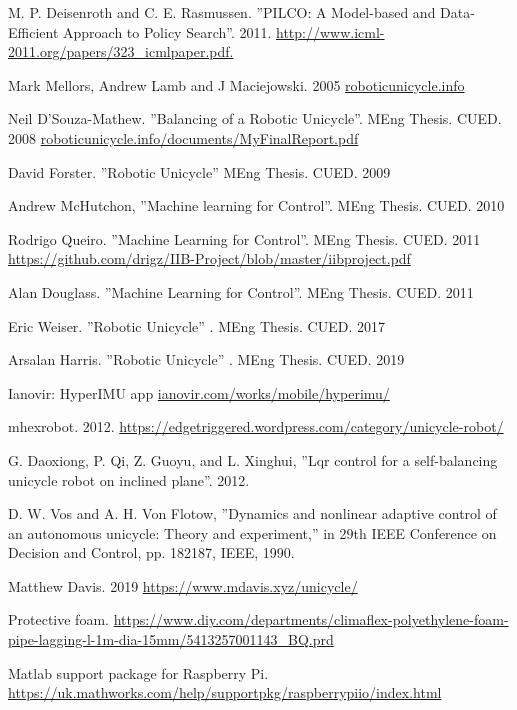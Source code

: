 \documentclass[twoside,twocolumn,12pt]{article}
\begin{document}
\clearpage
\begin{thebibliography}{9}
M. P. Deisenroth and C. E. Rasmussen. ''PILCO: A Model-based and Data-Efficient Approach to Policy Search''.
2011. \url{http://www.icml-2011.org/papers/323_icmlpaper.pdf.}

Mark Mellors, Andrew Lamb and J Maciejowski. 2005 \url{roboticunicycle.info} 

Neil D'Souza-Mathew. ''Balancing of a Robotic Unicycle''. MEng Thesis. CUED. 2008 \url{roboticunicycle.info/documents/MyFinalReport.pdf}

David Forster. ''Robotic Unicycle'' MEng Thesis. CUED. 2009

Andrew McHutchon, ''Machine learning for Control''. MEng Thesis. CUED. 2010

Rodrigo Queiro. ''Machine Learning for Control''. MEng Thesis. CUED. 2011
\url{https://github.com/drigz/IIB-Project/blob/master/iibproject.pdf}

Alan Douglass. ''Machine Learning for Control''. MEng Thesis. CUED. 2011

Eric Weiser. ''Robotic Unicycle'' . MEng Thesis. CUED. 2017

Arsalan Harris. ''Robotic Unicycle'' . MEng Thesis. CUED. 2019
 
 
Ianovir: HyperIMU app 
\url{ianovir.com/works/mobile/hyperimu/}

mhexrobot. 2012. \url{https://edgetriggered.wordpress.com/category/unicycle-robot/}

G. Daoxiong, P. Qi, Z. Guoyu, and L. Xinghui, ''Lqr control for a self-balancing unicycle
robot on inclined plane''. 2012.

D. W. Vos and A. H. Von Flotow, ''Dynamics and nonlinear adaptive control of an
autonomous unicycle: Theory and experiment,'' in 29th IEEE Conference on Decision
and Control, pp. 182{187, IEEE, 1990.}

Matthew Davis. 2019 \url{https://www.mdavis.xyz/unicycle/}

Protective foam. \url{https://www.diy.com/departments/climaflex-polyethylene-foam-pipe-lagging-l-1m-dia-15mm/5413257001143_BQ.prd}

Matlab support package for Raspberry Pi. \url{https://uk.mathworks.com/help/supportpkg/raspberrypiio/index.html}


\end{thebibliography}
\end{document}
